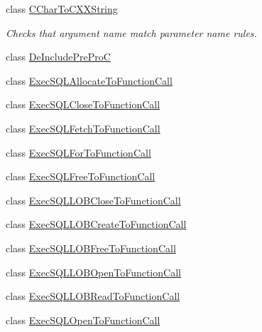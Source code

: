 \begin{DoxyCompactItemize}
\item 
class \hyperlink{classclang_1_1tidy_1_1pagesjaunes_1_1_c_char_to_c_x_x_string}{C\+Char\+To\+C\+X\+X\+String}
\begin{DoxyCompactList}\small\item\em Checks that argument name match parameter name rules. \end{DoxyCompactList}\item 
class \hyperlink{classclang_1_1tidy_1_1pagesjaunes_1_1_de_include_pre_pro_c}{De\+Include\+Pre\+ProC}
\item 
class \hyperlink{classclang_1_1tidy_1_1pagesjaunes_1_1_exec_s_q_l_allocate_to_function_call}{Exec\+S\+Q\+L\+Allocate\+To\+Function\+Call}
\item 
class \hyperlink{classclang_1_1tidy_1_1pagesjaunes_1_1_exec_s_q_l_close_to_function_call}{Exec\+S\+Q\+L\+Close\+To\+Function\+Call}
\item 
class \hyperlink{classclang_1_1tidy_1_1pagesjaunes_1_1_exec_s_q_l_fetch_to_function_call}{Exec\+S\+Q\+L\+Fetch\+To\+Function\+Call}
\item 
class \hyperlink{classclang_1_1tidy_1_1pagesjaunes_1_1_exec_s_q_l_for_to_function_call}{Exec\+S\+Q\+L\+For\+To\+Function\+Call}
\item 
class \hyperlink{classclang_1_1tidy_1_1pagesjaunes_1_1_exec_s_q_l_free_to_function_call}{Exec\+S\+Q\+L\+Free\+To\+Function\+Call}
\item 
class \hyperlink{classclang_1_1tidy_1_1pagesjaunes_1_1_exec_s_q_l_l_o_b_close_to_function_call}{Exec\+S\+Q\+L\+L\+O\+B\+Close\+To\+Function\+Call}
\item 
class \hyperlink{classclang_1_1tidy_1_1pagesjaunes_1_1_exec_s_q_l_l_o_b_create_to_function_call}{Exec\+S\+Q\+L\+L\+O\+B\+Create\+To\+Function\+Call}
\item 
class \hyperlink{classclang_1_1tidy_1_1pagesjaunes_1_1_exec_s_q_l_l_o_b_free_to_function_call}{Exec\+S\+Q\+L\+L\+O\+B\+Free\+To\+Function\+Call}
\item 
class \hyperlink{classclang_1_1tidy_1_1pagesjaunes_1_1_exec_s_q_l_l_o_b_open_to_function_call}{Exec\+S\+Q\+L\+L\+O\+B\+Open\+To\+Function\+Call}
\item 
class \hyperlink{classclang_1_1tidy_1_1pagesjaunes_1_1_exec_s_q_l_l_o_b_read_to_function_call}{Exec\+S\+Q\+L\+L\+O\+B\+Read\+To\+Function\+Call}
\item 
class \hyperlink{classclang_1_1tidy_1_1pagesjaunes_1_1_exec_s_q_l_open_to_function_call}{Exec\+S\+Q\+L\+Open\+To\+Function\+Call}

\end{DoxyCompactItemize}
